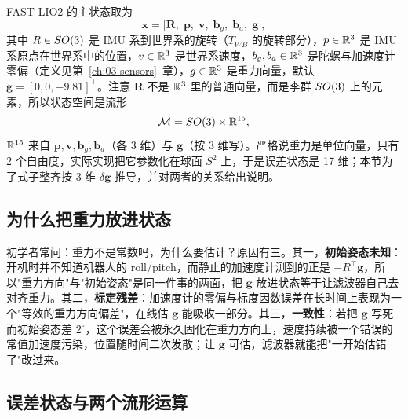 FAST-LIO2 的主状态取为
\begin{equation}\label{eq:17-state}
  \bm{x}=\bigl[\bm{R},\;\bm{p},\;\bm{v},\;\bm{b}_g,\;\bm{b}_a,\;\bm{g}\bigr],
\end{equation}
其中 $R\in SO(3)$ 是 IMU 系到世界系的旋转（$T_{WB}$ 的旋转部分），$p\in\mathbb{R}^3$ 是 IMU 系原点在世界系中的位置，$v\in\mathbb{R}^3$ 是世界系速度，$b_g,b_a\in\mathbb{R}^3$ 是陀螺与加速度计零偏（定义见第~\ref{ch:03-sensors}~章），$g\in\mathbb{R}^3$ 是重力向量，默认 $\bm{g}=[0,0,-9.81]^{\top}$。注意 $\bm{R}$ 不是 $\mathbb{R}^3$ 里的普通向量，而是李群 $SO(3)$ 上的元素，所以状态空间是流形
\begin{equation}
  \mathcal{M}=SO(3)\times\mathbb{R}^{15},
\end{equation}
$\mathbb{R}^{15}$ 来自 $\bm{p},\bm{v},\bm{b}_g,\bm{b}_a$（各 3 维）与 $\bm{g}$（按 3 维写）。严格说重力是单位向量，只有 2 个自由度，实际实现把它参数化在球面 $S^2$ 上，于是误差状态是 17 维；本节为了式子整齐按 3 维 $\delta\bm{g}$ 推导，并对两者的关系给出说明。

\subsection{为什么把重力放进状态}

初学者常问：重力不是常数吗，为什么要估计？原因有三。其一，\textbf{初始姿态未知}：开机时并不知道机器人的 roll/pitch，而静止的加速度计测到的正是 $-R^{\top}\bm{g}$，所以"重力方向"与"初始姿态"是同一件事的两面，把 $\bm{g}$ 放进状态等于让滤波器自己去对齐重力。其二，\textbf{标定残差}：加速度计的零偏与标度因数误差在长时间上表现为一个"等效的重力方向偏差"，在线估 $\bm{g}$ 能吸收一部分。其三，\textbf{一致性}：若把 $\bm{g}$ 写死而初始姿态差 $2^{\circ}$，这个误差会被永久固化在重力方向上，速度持续被一个错误的常值加速度污染，位置随时间二次发散；让 $\bm{g}$ 可估，滤波器就能把"一开始估错了"改过来。

\subsection{误差状态与两个流形运算}

